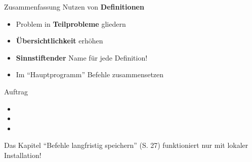 \begin{frame}[fragile]{Zusammenfassung}
Nutzen von \textbf{Definitionen}
\begin{itemize}[<+->]
\item Problem in \textbf{Teilprobleme} gliedern
\item \textbf{Übersichtlichkeit} erhöhen
\item \textbf{Sinnstiftender} Name für jede Definition!
\item Im ``Hauptprogramm'' Befehle zusammensetzen
\end{itemize}
\end{frame}

\begin{frame}[fragile]{Auftrag}
\begin{itemize}
\item {}
\item {}
\item {}
\end{itemize}
\begin{mycaution}
Das Kapitel ``Befehle langfristig speichern'' (S. 27) funktioniert nur mit lokaler Installation!
\end{mycaution}
\end{frame}

